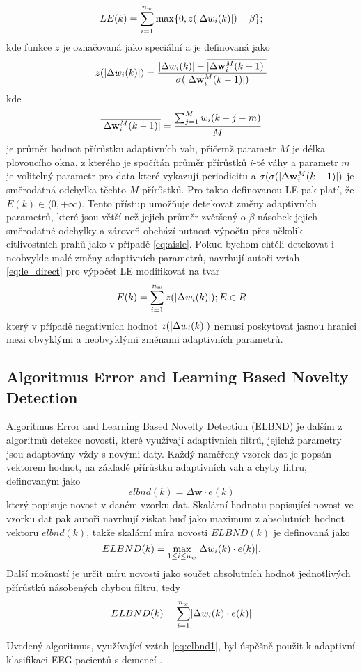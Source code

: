 \begin{equation}\label{eq:le_direct}
LE(k)=\sum_{i=1}^{n_w} \max \{0,z(\lvert\Delta w_i(k)\rvert)-\beta \};
\end{equation}
kde funkce $z$ je označovaná jako speciální  a je definovaná jako
\begin{equation}
z(\lvert\Delta w_i(k)\rvert) = \frac{\lvert\Delta w_i(k)\rvert-\overline{\lvert\Delta\textbf{w}_i^M(k-1)\rvert}}{\sigma(\lvert\Delta \textbf{w}_i^M(k-1)\rvert)}
\end{equation}
kde
\begin{equation}
\overline{\lvert\Delta \textbf{w}_i^M(k-1)\rvert}=\frac{\sum_{j=1}^M w_i(k-j-m)}{M}
\end{equation} 
je průměr hodnot přírůstku adaptivních vah, přičemž parametr $M$ je délka plovoucího okna, z kterého je spočítán průměr přírůstků $i$-té váhy a parametr $m$ je volitelný parametr pro data které vykazují periodicitu a $\sigma(\sigma(\lvert\Delta \textbf{w}_i^M(k-1)\rvert)$ je směrodatná odchylka těchto $M$ přírůstků. Pro takto definovanou LE pak platí, že $E(k)\in \langle0,+\infty)$. Tento přístup umožňuje detekovat změny adaptivních parametrů, které jsou větší než jejich průměr zvětšený o $\beta$ násobek jejich směrodatné odchylky a zároveň obchází nutnost výpočtu přes několik citlivostních prahů jako v případě \ref{eq:aisle}. Pokud bychom chtěli detekovat i neobvykle malé změny adaptivních parametrů, navrhují autoři vztah  \ref{eq:le_direct} pro výpočet LE  modifikovat na tvar
\begin{equation}\label{eq:le_direct_padasip}
E(k)=\sum_{i=1}^{n_w}z(\lvert\Delta w_i(k)\rvert); E \in R
\end{equation}
který v případě negativních hodnot $z(\lvert\Delta w_i(k)\rvert)$ nemusí poskytovat jasnou hranici mezi obvyklými a neobvyklými změnami adaptivních parametrů.
\subsection{Algoritmus Error and Learning Based Novelty Detection}\label{chap:elbnd}
Algoritmus Error and Learning Based Novelty Detection (ELBND) \cite{elbnd1,elbnd2} je dalším z algoritmů detekce novosti, které využívají adaptivních filtrů, jejichž parametry jsou adaptovány vždy s novými daty. Každý naměřený vzorek dat je popsán vektorem hodnot, na základě přírůstku adaptivních vah a chyby filtru, definovaným jako
\begin{equation}
	elbnd(k)=\Delta\textbf{w}\cdot e(k)
\end{equation}
který popisuje novost v daném vzorku dat. Skalární hodnotu popisující novost ve vzorku dat pak autoři navrhují získat buď jako maximum z absolutních hodnot vektoru $elbnd(k)$, takže skalární míra novosti $ELBND(k)$ je definovaná jako
\begin{equation}\label{eq:elbnd1}
ELBND(k) = \max_{1\leq i \leq n_w} \lvert\Delta w_i(k) \cdot e(k)\rvert.
\end{equation}
Další možností je určit míru novosti jako součet absolutních hodnot jednotlivých přírůstků násobených chybou filtru, tedy
\begin{equation}\label{eq:elbnd2}
	ELBND(k)=\sum_{i=1}^{n_w}\lvert\Delta w_i(k)\cdot e(k)\rvert
\end{equation}

Uvedený algoritmus, využívající vztah \ref{eq:elbnd1}, byl úspěšně použit k adaptivní klasifikaci EEG pacientů s demencí \cite{elbnd3}.


